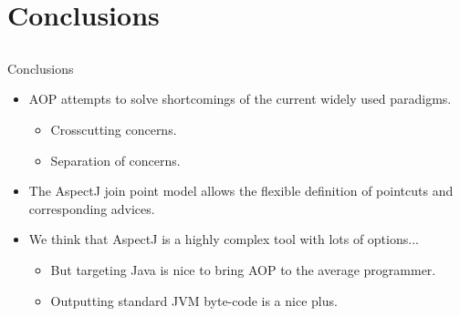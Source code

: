 \documentclass[11pt]{beamer}
\begin{document}
\section{Conclusions}
\subsection*{}
\begin{frame}{Conclusions}
\begin{itemize}
   \item AOP attempts to solve shortcomings of the current widely used paradigms.
   \begin{itemize}
      \item Crosscutting concerns.
      \item Separation of concerns.
   \end{itemize}
   \item The AspectJ join point model allows the flexible definition of pointcuts and corresponding advices. 
   \item We think that AspectJ is a highly complex tool with lots of options...
   \begin{itemize}
      \item But targeting Java is nice to bring AOP to the average programmer.
      \item Outputting standard JVM byte-code is a nice plus.
   \end{itemize}
\end{itemize}
\end{frame}

\section*{}
\frame{\titlepage}

\end{document}
